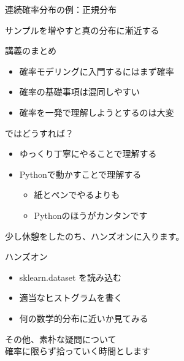 \documentclass[dvipdfmx,cjk]{beamer}
\begin{document}
\begin{frame}{連続確率分布の例：正規分布}


\end{frame}


\begin{frame}{サンプルを増やすと真の分布に漸近する}


\end{frame}



\begin{frame}{講義のまとめ}

\begin{itemize}
    \item 確率モデリングに入門するにはまず確率
    \item 確率の基礎事項は混同しやすい
    \item 確率を一発で理解しようとするのは大変
\end{itemize}

\vskip 1cm
ではどうすれば？

\begin{itemize}
    \item ゆっくり丁寧にやることで理解する
    \item Pythonで動かすことで理解する
        \begin{itemize}
        \item 紙とペンでやるよりも
        \item Pythonのほうがカンタンです
        \end{itemize}
\end{itemize}

\vskip 1cm
少し休憩をしたのち、ハンズオンに入ります。

\end{frame}


\begin{frame}{ハンズオン}

\begin{itemize}
    \item sklearn.dataset を読み込む
    \item 適当なヒストグラムを書く
    \item 何の数学的分布に近いか見てみる
\end{itemize}

\vskip 1cm
その他、素朴な疑問について\\確率に限らず拾っていく時間とします

\end{frame}


\end{document}
